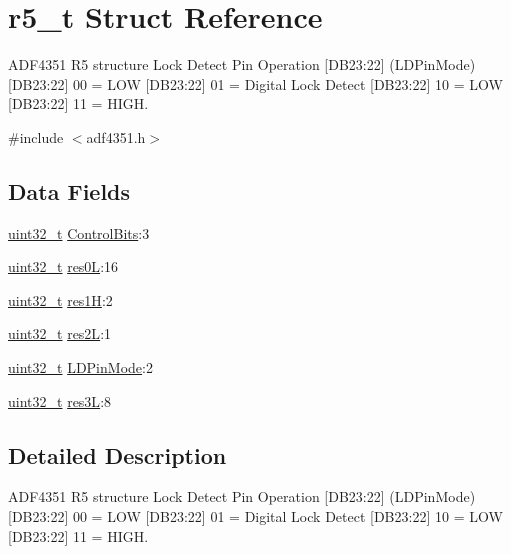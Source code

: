 \hypertarget{structr5__t}{}\section{r5\+\_\+t Struct Reference}
\label{structr5__t}


A\+D\+F4351 R5 structure Lock Detect Pin Operation \mbox{[}D\+B23\+:22\mbox{]} (L\+D\+Pin\+Mode) \mbox{[}D\+B23\+:22\mbox{]} 00 = L\+OW \mbox{[}D\+B23\+:22\mbox{]} 01 = Digital Lock Detect \mbox{[}D\+B23\+:22\mbox{]} 10 = L\+OW \mbox{[}D\+B23\+:22\mbox{]} 11 = H\+I\+GH.  




{\ttfamily \#include $<$adf4351.\+h$>$}

\subsection*{Data Fields}
\begin{DoxyCompactItemize}
\item 
\hyperlink{send_8c_a435d1572bf3f880d55459d9805097f62}{uint32\+\_\+t} \hyperlink{structr5__t_aa71c458a3167da85d477b00cf0ae346a}{Control\+Bits}\+:3
\item 
\hyperlink{send_8c_a435d1572bf3f880d55459d9805097f62}{uint32\+\_\+t} \hyperlink{structr5__t_ac295706ea60257469bdd2074f7ec3197}{res0L}\+:16
\item 
\hyperlink{send_8c_a435d1572bf3f880d55459d9805097f62}{uint32\+\_\+t} \hyperlink{structr5__t_ac2077b2cbd35a25d80a3b485aeeeca16}{res1H}\+:2
\item 
\hyperlink{send_8c_a435d1572bf3f880d55459d9805097f62}{uint32\+\_\+t} \hyperlink{structr5__t_ad6a330a8f3ac938062893adae1547ad2}{res2L}\+:1
\item 
\hyperlink{send_8c_a435d1572bf3f880d55459d9805097f62}{uint32\+\_\+t} \hyperlink{structr5__t_a55135418b639eabcc007205a689dd828}{L\+D\+Pin\+Mode}\+:2
\item 
\hyperlink{send_8c_a435d1572bf3f880d55459d9805097f62}{uint32\+\_\+t} \hyperlink{structr5__t_a4b3d74a8e15b3a85981a8cc7fe4c26b4}{res3L}\+:8
\end{DoxyCompactItemize}


\subsection{Detailed Description}
A\+D\+F4351 R5 structure Lock Detect Pin Operation \mbox{[}D\+B23\+:22\mbox{]} (L\+D\+Pin\+Mode) \mbox{[}D\+B23\+:22\mbox{]} 00 = L\+OW \mbox{[}D\+B23\+:22\mbox{]} 01 = Digital Lock Detect \mbox{[}D\+B23\+:22\mbox{]} 10 = L\+OW \mbox{[}D\+B23\+:22\mbox{]} 11 = H\+I\+GH. 

